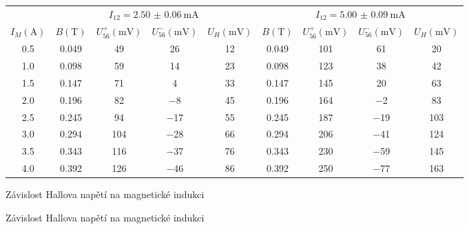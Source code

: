 \begin{tabulka}[htbp]
\centering
\begin{tabular}{c||c|c|c|c||c|c|c|c}
& \multicolumn{4}{c||}{$I_{12}=\SI{2.50(6)}{\milli\ampere}$}  &  \multicolumn{4}{c}{$I_{12} = \SI{5.00(9)}{\milli\ampere}$} \\
$I_M (\si{\ampere})$ & $B (\si{\tesla})$ & $U_{56}^+ (\si{\milli\volt})$ & $U_{56}^- (\si{\milli\volt})$ & $U_H (\si{\milli\volt})$ & $B (\si{\tesla})$ & $U_{56}^+ (\si{\milli\volt})$ & $U_{56}^- (\si{\milli\volt})$  & $U_H (\si{\milli\volt})$ \\ \hline
\num{0.5} & \num{0.049} & \num{49} & \num{26} & \num{12} & \num{0.049} & \num{101} & \num{61}  & \num{20} \\
\num{1.0} & \num{0.098} & \num{59} & \num{14} & \num{23} & \num{0.098} & \num{123} & \num{38}  & \num{42} \\
\num{1.5} & \num{0.147} & \num{71} & \num{4} & \num{33} & \num{0.147} & \num{145} & \num{20}  & \num{63} \\
\num{2.0} & \num{0.196} & \num{82} & \num{-8} & \num{45} & \num{0.196} & \num{164} & \num{-2}  & \num{83} \\
\num{2.5} & \num{0.245} & \num{94} & \num{-17} & \num{55} & \num{0.245} & \num{187} & \num{-19}  & \num{103} \\
\num{3.0} & \num{0.294} & \num{104} & \num{-28} & \num{66} & \num{0.294} & \num{206} & \num{-41}  & \num{124} \\
\num{3.5} & \num{0.343} & \num{116} & \num{-37} & \num{76} & \num{0.343} & \num{230} & \num{-59}  & \num{145} \\
\num{4.0} & \num{0.392} & \num{126} & \num{-46} & \num{86} & \num{0.392} & \num{250} & \num{-77}  & \num{163} \\
\end{tabular}
\caption{Závislost Hallova napětí na magnetické indukci}
\label{t:hall}
\end{tabulka}

\begin{graph}[htbp]
\centering

\caption{Závislost Hallova napětí na magnetické indukci}
\label{g:hall}
\end{graph}